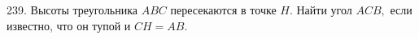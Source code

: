 239. Высоты треугольника $ABC$ пересекаются в точке $H.$ Найти угол $ACB,$ если известно, что он тупой и $CH=AB.$\\
